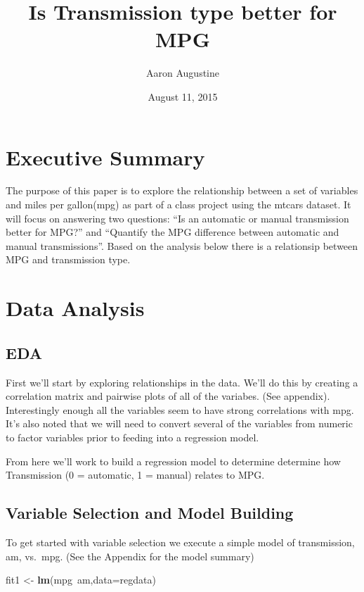 \documentclass[]{article}
\title{Is Transmission type better for MPG}
\author{Aaron Augustine}
\date{August 11, 2015}
\newenvironment{Shaded}{\begin{snugshade}}{\end{snugshade}}
\newcommand{\KeywordTok}[1]{\textcolor[rgb]{0.13,0.29,0.53}{\textbf{{#1}}}}
\newcommand{\DataTypeTok}[1]{\textcolor[rgb]{0.13,0.29,0.53}{{#1}}}
\newcommand{\StringTok}[1]{\textcolor[rgb]{0.31,0.60,0.02}{{#1}}}
\newcommand{\NormalTok}[1]{{#1}}
\begin{document}
\maketitle


\section{Executive Summary}\label{executive-summary}

The purpose of this paper is to explore the relationship between a set
of variables and miles per gallon(mpg) as part of a class project using
the mtcars dataset. It will focus on answering two questions: ``Is an
automatic or manual transmission better for MPG?'' and ``Quantify the
MPG difference between automatic and manual transmissions''. Based on
the analysis below there is a relationsip between MPG and transmission
type.

\section{Data Analysis}\label{data-analysis}

\subsection{EDA}\label{eda}

First we'll start by exploring relationships in the data. We'll do this
by creating a correlation matrix and pairwise plots of all of the
variabes. (See appendix). Interestingly enough all the variables seem to
have strong correlations with mpg. It's also noted that we will need to
convert several of the variables from numeric to factor variables prior
to feeding into a regression model.

From here we'll work to build a regression model to determine determine
how Transmission (0 = automatic, 1 = manual) relates to MPG.

\subsection{Variable Selection and Model
Building}\label{variable-selection-and-model-building}

To get started with variable selection we execute a simple model of
transmission, am, vs.~mpg. (See the Appendix for the model summary)

\begin{Shaded}
\begin{Highlighting}[]
\NormalTok{fit1 <-}\StringTok{ }\KeywordTok{lm}\NormalTok{(mpg~am,}\DataTypeTok{data=}\NormalTok{regdata)}
\end{Highlighting}
\end{Shaded}
\end{document}
